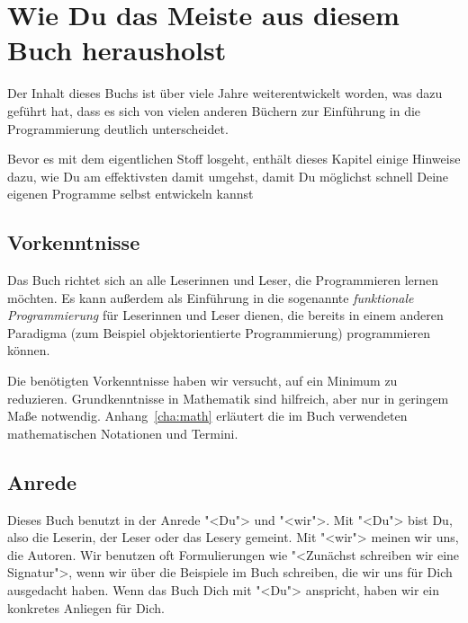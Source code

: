 
\setcounter{chapter}{-1}
\chapter{Wie Du das Meiste aus diesem Buch herausholst}

Der Inhalt dieses Buchs ist über viele Jahre weiterentwickelt worden,
was dazu geführt hat, dass es sich von vielen anderen Büchern zur
Einführung in die Programmierung deutlich unterscheidet.

Bevor es mit dem eigentlichen Stoff losgeht, enthält dieses Kapitel
einige Hinweise dazu, wie Du am effektivsten damit umgehst, damit Du
möglichst schnell Deine eigenen Programme selbst entwickeln kannst

\section{Vorkenntnisse}

Das Buch richtet sich an alle Leserinnen und Leser, die Programmieren
lernen möchten.  Es kann außerdem als Einführung in die sogenannte
\textit{funktionale Programmierung} für Leserinnen und Leser dienen,
die bereits in einem anderen Paradigma (zum Beispiel objektorientierte
Programmierung) programmieren können.

Die benötigten Vorkenntnisse haben wir versucht, auf ein Minimum zu
reduzieren.  Grundkenntnisse in Mathematik sind hilfreich, aber nur in
geringem Maße notwendig.  Anhang~\ref{cha:math} erläutert die im Buch
verwendeten mathematischen Notationen und Termini.

\section{Anrede}

Dieses Buch benutzt in der Anrede "<Du"> und "<wir">.  Mit "<Du"> bist
Du, also die Leserin, der Leser oder das Lesery gemeint.  Mit "<wir"> meinen wir
uns, die Autoren.  Wir benutzen oft Formulierungen wie "<Zunächst
schreiben wir eine Signatur">, wenn wir über die Beispiele im Buch
schreiben, die wir uns für Dich ausgedacht haben.  Wenn das Buch Dich
mit "<Du"> anspricht, haben wir ein konkretes Anliegen für Dich.

